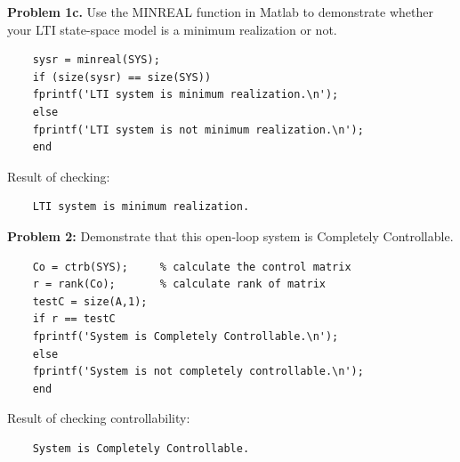 \documentclass[14pt,a4paper]{article}
\begin{document}
\pagebreak
\large\textbf{Problem 1c.} Use the MINREAL function in Matlab to demonstrate whether your LTI state-space model is a minimum realization or not.
	\begin{lstlisting}
	sysr = minreal(SYS);
	if (size(sysr) == size(SYS))
	fprintf('LTI system is minimum realization.\n');
	else
	fprintf('LTI system is not minimum realization.\n');
	end
	\end{lstlisting}
	Result of checking:
	\begin{lstlisting}
	LTI system is minimum realization.
	\end{lstlisting}
\pagebreak
\large\textbf{Problem 2:} Demonstrate that this open-loop system is Completely Controllable. 
	\begin{lstlisting}
	Co = ctrb(SYS);     % calculate the control matrix
	r = rank(Co);       % calculate rank of matrix
	testC = size(A,1);
	if r == testC
	fprintf('System is Completely Controllable.\n');
	else
	fprintf('System is not completely controllable.\n');
	end
	\end{lstlisting}
	Result of checking controllability:
	\begin{lstlisting}
	System is Completely Controllable.
	\end{lstlisting}
	
\end{document}
